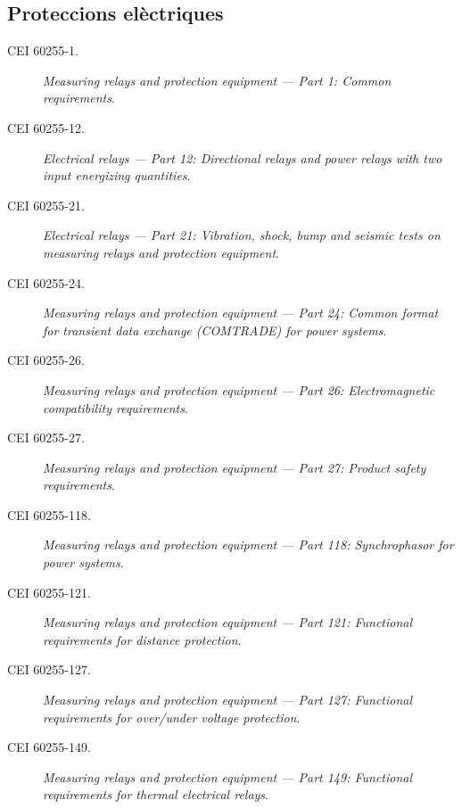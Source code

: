 \subsection*{Proteccions elèctriques}
\begin{description}
    \item [\hspace{5mm}CEI 60255-1.] \textit{Measuring relays and protection equipment --- Part 1: Common requirements}.
    \item [\hspace{5mm}CEI 60255-12.] \textit{Electrical relays --- Part 12: Directional relays and power relays with two input energizing quantities}.
    \item [\hspace{5mm}CEI 60255-21.] \textit{Electrical relays --- Part 21: Vibration, shock, bump and seismic tests on measuring relays and protection equipment}.
    \item [\hspace{5mm}CEI 60255-24.] \textit{Measuring relays and protection equipment --- Part 24: Common format for transient data exchange (COMTRADE) for power systems}.
    \item [\hspace{5mm}CEI 60255-26.] \textit{Measuring relays and protection equipment --- Part 26: Electromagnetic compatibility requirements}.
    \item [\hspace{5mm}CEI 60255-27.] \textit{Measuring relays and protection equipment --- Part 27: Product safety requirements}.
    \item [\hspace{5mm}CEI 60255-118.] \textit{Measuring relays and protection equipment --- Part 118: Synchrophasor for power systems}.
    \item [\hspace{5mm}CEI 60255-121.] \textit{Measuring relays and protection equipment --- Part 121: Functional requirements for distance protection}.
    \item [\hspace{5mm}CEI 60255-127.] \textit{Measuring relays and protection equipment --- Part 127: Functional requirements for over/under voltage protection}.
    \item [\hspace{5mm}CEI 60255-149.] \textit{Measuring relays and protection equipment --- Part 149:  Functional requirements for thermal electrical relays}.

\end{description}
